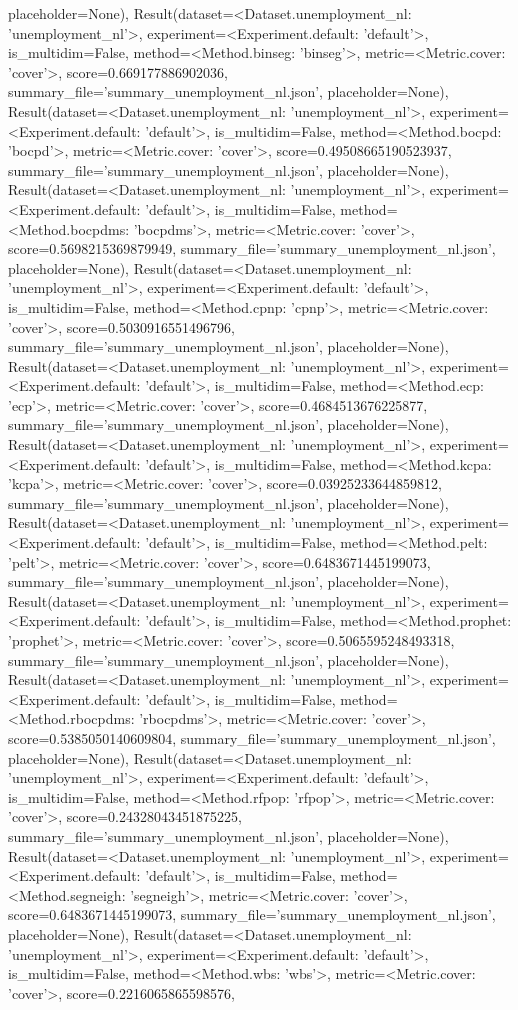 placeholder=None), Result(dataset=<Dataset.unemployment_nl: 'unemployment_nl'>, experiment=<Experiment.default: 'default'>, is_multidim=False, method=<Method.binseg: 'binseg'>, metric=<Metric.cover: 'cover'>, score=0.669177886902036, summary_file='summary_unemployment_nl.json', placeholder=None), Result(dataset=<Dataset.unemployment_nl: 'unemployment_nl'>, experiment=<Experiment.default: 'default'>, is_multidim=False, method=<Method.bocpd: 'bocpd'>, metric=<Metric.cover: 'cover'>, score=0.49508665190523937, summary_file='summary_unemployment_nl.json', placeholder=None), Result(dataset=<Dataset.unemployment_nl: 'unemployment_nl'>, experiment=<Experiment.default: 'default'>, is_multidim=False, method=<Method.bocpdms: 'bocpdms'>, metric=<Metric.cover: 'cover'>, score=0.5698215369879949, summary_file='summary_unemployment_nl.json', placeholder=None), Result(dataset=<Dataset.unemployment_nl: 'unemployment_nl'>, experiment=<Experiment.default: 'default'>, is_multidim=False, method=<Method.cpnp: 'cpnp'>, metric=<Metric.cover: 'cover'>, score=0.5030916551496796, summary_file='summary_unemployment_nl.json', placeholder=None), Result(dataset=<Dataset.unemployment_nl: 'unemployment_nl'>, experiment=<Experiment.default: 'default'>, is_multidim=False, method=<Method.ecp: 'ecp'>, metric=<Metric.cover: 'cover'>, score=0.4684513676225877, summary_file='summary_unemployment_nl.json', placeholder=None), Result(dataset=<Dataset.unemployment_nl: 'unemployment_nl'>, experiment=<Experiment.default: 'default'>, is_multidim=False, method=<Method.kcpa: 'kcpa'>, metric=<Metric.cover: 'cover'>, score=0.03925233644859812, summary_file='summary_unemployment_nl.json', placeholder=None), Result(dataset=<Dataset.unemployment_nl: 'unemployment_nl'>, experiment=<Experiment.default: 'default'>, is_multidim=False, method=<Method.pelt: 'pelt'>, metric=<Metric.cover: 'cover'>, score=0.6483671445199073, summary_file='summary_unemployment_nl.json', placeholder=None), Result(dataset=<Dataset.unemployment_nl: 'unemployment_nl'>, experiment=<Experiment.default: 'default'>, is_multidim=False, method=<Method.prophet: 'prophet'>, metric=<Metric.cover: 'cover'>, score=0.5065595248493318, summary_file='summary_unemployment_nl.json', placeholder=None), Result(dataset=<Dataset.unemployment_nl: 'unemployment_nl'>, experiment=<Experiment.default: 'default'>, is_multidim=False, method=<Method.rbocpdms: 'rbocpdms'>, metric=<Metric.cover: 'cover'>, score=0.5385050140609804, summary_file='summary_unemployment_nl.json', placeholder=None), Result(dataset=<Dataset.unemployment_nl: 'unemployment_nl'>, experiment=<Experiment.default: 'default'>, is_multidim=False, method=<Method.rfpop: 'rfpop'>, metric=<Metric.cover: 'cover'>, score=0.24328043451875225, summary_file='summary_unemployment_nl.json', placeholder=None), Result(dataset=<Dataset.unemployment_nl: 'unemployment_nl'>, experiment=<Experiment.default: 'default'>, is_multidim=False, method=<Method.segneigh: 'segneigh'>, metric=<Metric.cover: 'cover'>, score=0.6483671445199073, summary_file='summary_unemployment_nl.json', placeholder=None), Result(dataset=<Dataset.unemployment_nl: 'unemployment_nl'>, experiment=<Experiment.default: 'default'>, is_multidim=False, method=<Method.wbs: 'wbs'>, metric=<Metric.cover: 'cover'>, score=0.2216065865598576, 